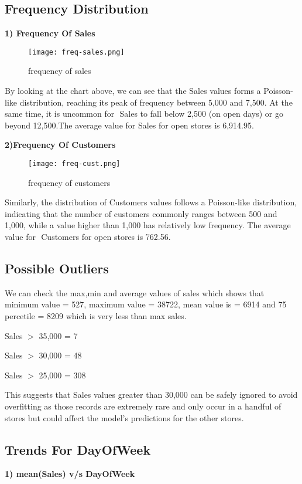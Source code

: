 \documentclass[letterpaper, 10 pt, conference]{ieeeconf}  %
\begin{document}
\subsection{Frequency Distribution}
\textbf{1) Frequency Of Sales}
\begin{figure}[h!]
    \centering
    \texttt{[image: freq-sales.png]}
    \caption{frequency of sales}
\end{figure}

By looking at the chart above, we can see that the Sales values forms a Poisson-like distribution, reaching its peak of frequency between 5,000 and 7,500. At the same time, it is uncommon for ​ Sales to fall below 2,500 (on open days) or go beyond 12,500.The average value for ​ Sales for open stores is 6,914.95.\bigskip


\textbf{2)Frequency Of Customers}
\begin{figure}[h!]
    \centering
    \texttt{[image: freq-cust.png]}
    \caption{frequency of customers}
\end{figure}

Similarly, the distribution of Customers values follows a Poisson-like distribution, indicating that the number of customers commonly ranges between 500 and 1,000, while a value higher than 1,000 has relatively low frequency. The average value for ​ Customers for open stores is 762.56.

\subsection{Possible Outliers}
We can check the max,min and average values of sales which shows that minimum value = 527, maximum value = 38722, mean value is = 6914 and 75 percetile = 8209 which is very less than max sales.

Sales $>$  35,000 = 7

Sales $>$  30,000 = 48

Sales $>$ 25,000 = 308

This suggests that Sales values greater than 30,000 can be safely ignored to avoid overfitting as those records are extremely rare and only occur in a handful of stores but could affect the model’s predictions for the other stores.

\subsection{Trends For DayOfWeek}
\textbf{1) mean(Sales) v/s DayOfWeek}
\end{document}
